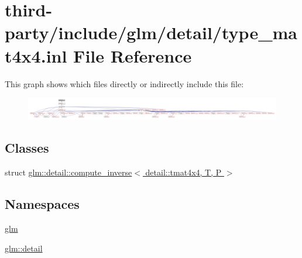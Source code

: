 \hypertarget{type__mat4x4_8inl}{}\section{third-\/party/include/glm/detail/type\+\_\+mat4x4.inl File Reference}
\label{type__mat4x4_8inl}
This graph shows which files directly or indirectly include this file\+:
\nopagebreak
\begin{figure}[H]
\begin{center}
\leavevmode
\includegraphics[width=350pt]{type__mat4x4_8inl__dep__incl}
\end{center}
\end{figure}
\subsection*{Classes}
\begin{DoxyCompactItemize}
\item 
struct \hyperlink{structglm_1_1detail_1_1compute__inverse_3_01detail_1_1tmat4x4_00_01_t_00_01_p_01_4}{glm\+::detail\+::compute\+\_\+inverse$<$ detail\+::tmat4x4, T, P $>$}
\end{DoxyCompactItemize}
\subsection*{Namespaces}
\begin{DoxyCompactItemize}
\item 
 \hyperlink{namespaceglm}{glm}
\item 
 \hyperlink{namespaceglm_1_1detail}{glm\+::detail}
\end{DoxyCompactItemize}
